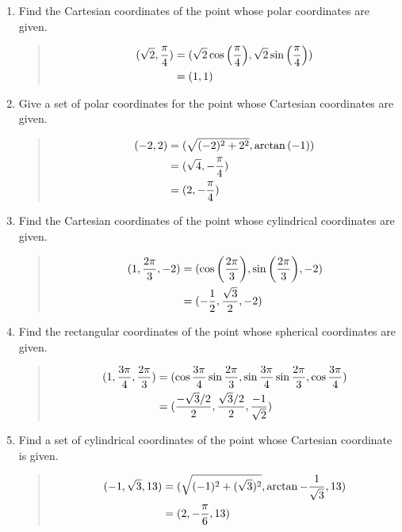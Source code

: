 \documentclass{hw}
\begin{document}

\begin{enumerate}
\item Find the Cartesian coordinates of the point whose polar coordinates are given.
\begin{quote}
\begin{align*}
(\sqrt{2},{\pi\over4}) &= (\sqrt{2}\cos{\left({\pi\over4}\right)},
\sqrt{2}\sin{\left({\pi\over4}\right)})\\
&= (1,1)
\end{align*}
\end{quote}

\item Give a set of polar coordinates for the point whose Cartesian coordinates are given.
\begin{quote}
\begin{align*}
(-2,2) &= (\sqrt{(-2)^{2} + 2^{2}}, \arctan{(-1)})\\
&= (\sqrt{4},-{\pi\over4})\\
&= (2,-{\pi\over4})
\end{align*}
\end{quote}

\item Find the Cartesian coordinates of the point whose cylindrical coordinates are given.
\begin{quote}
\begin{align*}
(1,{2\pi\over3},-2) &=
(\cos{\left({2\pi\over3}\right)},\sin{\left({2\pi\over3}\right)},-2)\\
&= (-{1\over2},{\sqrt{3}\over2},-2)
\end{align*}
\end{quote}

\item Find the rectangular coordinates of the point whose spherical coordinates are given.
\begin{quote}
\begin{align*}
(1,{3\pi\over4},{2\pi\over3}) &=
(\cos{{3\pi\over4}}\sin{{2\pi\over3}},\sin{{3\pi\over4}}\sin{{2\pi\over3}},\cos{{3\pi\over4}})\\
&= ({-\sqrt{3}/2\over2},{\sqrt{3}/2\over2},{-1\over\sqrt{2}})
\end{align*}
\end{quote}

\item Find a set of cylindrical coordinates of the point whose Cartesian coordinate is given.
\begin{quote}
\begin{align*}
(-1,\sqrt{3},13) &= (\sqrt{(-1)^2 + (\sqrt{3})^2},\arctan{-{1\over\sqrt{3}}},13)\\
&= (2,-{\pi\over6},13)
\end{align*}
\end{quote}


\end{enumerate}
\end{document}
